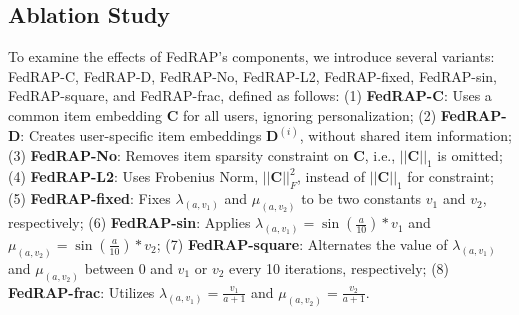\documentclass{article} %
\begin{document}
\subsection{Ablation Study}
To examine the effects of FedRAP's components, we introduce several variants: FedRAP-C, FedRAP-D, FedRAP-No, FedRAP-L2, FedRAP-fixed, FedRAP-sin, FedRAP-square, and FedRAP-frac, defined as follows: (1) \textbf{FedRAP-C}: Uses a common item embedding $\mathbf{C}$ for all users, ignoring personalization; (2) \textbf{FedRAP-D}: Creates user-specific item embeddings $\mathbf{D}^{(i)}$, without shared item information; (3) \textbf{FedRAP-No}: Removes item sparsity constraint on $\mathbf{C}$, i.e., $||\mathbf{C}||_1$ is omitted; (4) \textbf{FedRAP-L2}: Uses Frobenius Norm, $||\mathbf{C}||^2_F$, instead of $||\mathbf{C}||_1$ for constraint; (5) \textbf{FedRAP-fixed}: Fixes $\lambda_{(a,v_1)}$ and $\mu_{(a,v_2)}$ to be two constants $v_1$ and $v_2$, respectively; (6) \textbf{FedRAP-sin}: Applies $\lambda_{(a,v_1)} = \sin(\frac{a}{10})*v_1$ and $\mu_{(a,v_2)} = \sin(\frac{a}{10})*v_2$; (7) \textbf{FedRAP-square}: Alternates the value of $\lambda_{(a,v_1)}$ and $\mu_{(a,v_2)}$ between $0$ and $v_1$ or $v_2$ every 10 iterations, respectively; (8) \textbf{FedRAP-frac}: Utilizes $\lambda_{(a,v_1)} = \frac{v_1}{a+1}$ and $\mu_{(a,v_2)} = \frac{v_2}{a+1}$.
\end{document}
